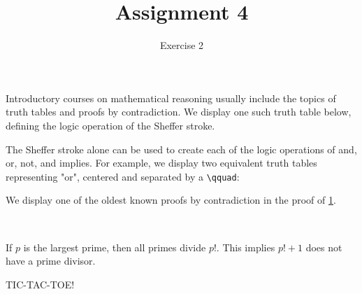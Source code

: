 \documentclass{article}
\title{Assignment 4}
\author{Exercise 2}
\date{}
\begin{document}
\maketitle

Introductory courses on mathematical reasoning usually include the topics of truth tables and proofs by contradiction. We display one such truth table below, defining the logic operation of the Sheffer stroke.
\begin{center}
\end{center}
The Sheffer stroke alone can be used to create each of the logic operations of and, or, not, and implies. For example, we display two equivalent truth tables representing "or", centered and separated by a \verb#\qquad#:
\begin{center}
 \qquad {}
\end{center}

We display one of the oldest known proofs by contradiction in the proof of \hyperlink{Theorem 1}{1}.

 \\

\begin{proofbyc}
    If $p$ is the largest prime, then all primes divide $p!$. This implies $p!+1$ does not have a prime divisor. \hfill
\end{proofbyc}

\begin{huge}
    \begin{center}
        TIC-TAC-TOE!

    \end{center}
\end{huge}
\end{document}
